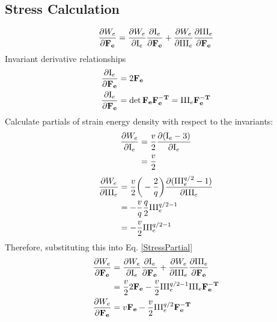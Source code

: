 \documentclass[12pt,3p]{article}
\numberwithin{equation}{section}
\begin{document}
\subsection{Stress Calculation}
\begin{align}\label{StressPartial}
\pdv{W_e}{\mathbf{F_{e}}} = \pdv{W_e}{\mathrm{I}_e} \pdv{\mathrm{I}_e}{\mathbf{F_e}} + \pdv{W_e}{\mathrm{III}_e} \pdv{\mathrm{III}_e}{\mathbf{F_e}} 
\end{align}
Invariant derivative relationships
\begin{align*}
\pdv{\mathrm{I}_e}{\mathbf{F_e}} &= 2 \mathbf{F_e} \\ 
\pdv{\mathrm{I}_e}{\mathbf{F_e}} &= \det \mathbf{F_e} \mathbf{F_e^{-T}} = \mathrm{III}_e \mathbf{F_e^{-T}} 
\end{align*}
Calculate partials of strain energy density with respect to the invariants:
\begin{align*}
\pdv{W_{e}}{\mathrm{I}_e} &= \frac{v}{2} \pdv{( \mathrm{I}_{e}-3 )}{\mathrm{I}_e} \\
					 &= \frac{v}{2} 
\end{align*}
\begin{align*}
\pdv{W_{e}}{\mathrm{III}_e} &= \frac{v}{2} \bigg( - \frac{2}{q} \bigg) \pdv{(\mathrm{III}_e^{q/2} - 1)}{\mathrm{III}_e} \\
					   &= - \frac{v}{q} \frac{q}{2} \mathrm{III}_e^{q/2 - 1} \\
					   &= - \frac{v}{2} \mathrm{III}_e^{q/2 - 1} 
\end{align*}
Therefore, substituting this into Eq. \ref{StressPartial}
\begin{align}
\begin{split}
\pdv{W_e}{\mathbf{F_{e}}} &= \pdv{W_e}{\mathrm{I}_e} \pdv{\mathrm{I}_e}{\mathbf{F_e}} + \pdv{W_e}{\mathrm{III}_e} \pdv{\mathrm{III}_e}{\mathbf{F_e}} \\
					&= \frac{v}{2} 2 \mathbf{F_e} - \frac{v}{2} \mathrm{III}_e^{q/2 - 1} \mathrm{III}_e \mathbf{F_e^{-T}} \\
\pdv{W_e}{\mathbf{F_{e}}} &= v \mathbf{F_e} - \frac{v}{2} \mathrm{III}_e^{q/2} \mathbf{F_e^{-T}}
\end{split}			
\end{align}

\end{document}
